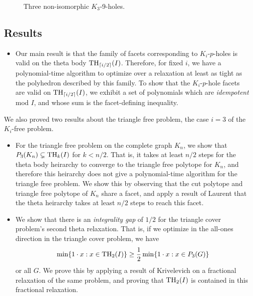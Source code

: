 \begin{figure}[htd]
	\caption{Three non-isomorphic $K_3$-9-holes.}
	\label{chap1:9holeintro}
\end{figure}

\subsection{Results}
\begin{itemize}
\item Our main result is that the family of facets corresponding to $K_i$-$p$-holes is valid on the theta body $\textup{TH}_{\lceil i/2\rceil }(I)$.
Therefore, for fixed $i$, we have a polynomial-time algorithm to optimize over a relaxation at least as tight as the polyhedron described by this family. 
To show that the $K_i$-$p$-hole facets are valid on $\textup{TH}_{\lceil i/2\rceil}(I)$, we exhibit a set of  polynomials which are {\em idempotent} mod $I$, and whose sum is the facet-defining inequality.
\end{itemize}
We also proved two results about the triangle free problem, the case $i=3$ of the $K_i$-free problem.
\begin{itemize}
\item For the triangle free problem on the complete graph $K_n$, we show that $P_3(K_n) \subsetneq \textup{TH}_{k}(I)$ for $k < n/2$.
That is, it takes at least $n/2$ steps for the theta body heirarchy to converge to the triangle free polytope for $K_n$, and therefore this heirarchy does not give a polynomial-time algorithm for the triangle free problem.
We show this by observing that the cut polytope and triangle free polytope of $K_n$ share a facet, and apply a result of Laurent \cite{moniquestuff} that the theta heirarchy takes at least $n/2$ steps to reach this facet.
\item We show that there is an {\em integrality gap} of $1/2$ for the triangle cover problem's second theta relaxation. 
That is, if we optimize in the all-ones direction in the triangle cover problem, we have 
$$\min \{1 \cdot x: x \in \textup{TH}_2(I) \} \ge \frac{1}{2} \min \{1 \cdot x: x \in P_3(G)\}$$
or all $G$. 
We prove this by applying a result of Krivelevich \cite{krivelevich} on a fractional relaxation of the same problem, and proving that $\textup{TH}_2(I)$ is contained in this fractional relaxation.
\end{itemize}
